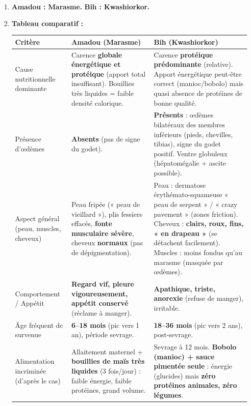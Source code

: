 \documentclass[11pt]{article}
\begin{document}
\begin{corrige}
\begin{enumerate}
    \item \textbf{Amadou : Marasme.} \textbf{Bih : Kwashiorkor.}
    \item \textbf{Tableau comparatif :}
    \begin{center}
    \begin{tabularx}{\linewidth}{|l|X|X|}\hline
    \rowcolor{popblueL}
    \textbf{Critère} & \textbf{Amadou (Marasme)} & \textbf{Bih (Kwashiorkor)} \\ \hline
    Cause nutritionnelle dominante & Carence \textbf{globale énergétique et protéique} (apport total insuffisant). Bouillies très liquides = faible densité calorique. & Carence \textbf{protéique prédominante} (relative). Apport énergétique peut-être correct (manioc/bobolo) mais quasi absence de protéines de bonne qualité. \\ \hline
    Présence d'œdèmes & \textbf{Absents} (pas de signe du godet). & \textbf{Présents} : œdèmes bilatéraux des membres inférieurs (pieds, chevilles, tibias), signe du godet positif. Ventre globuleux (hépatomégalie + ascite possible). \\ \hline
    Aspect général (peau, muscles, cheveux) & Peau fripée (« peau de vieillard »), plis fessiers effacés, \textbf{fonte musculaire sévère}, cheveux \textbf{normaux} (pas de dépigmentation). & Peau : dermatose érythémato-squameuse « peau de serpent » / « crazy pavement » (zones friction). Cheveux : \textbf{clairs, roux, fins, « en drapeau »} (se détachent facilement). Muscles : moins fondus qu'au marasme (masquée par œdèmes). \\ \hline
    Comportement / Appétit & \textbf{Regard vif, pleure vigoureusement, appétit conservé} (réclame à manger). & \textbf{Apathique, triste, anorexie} (refuse de manger), irritable. \\ \hline
    Âge fréquent de survenue & \textbf{6–18 mois} (pic vers 1 an), période sevrage. & \textbf{18–36 mois} (pic vers 2 ans), post-sevrage. \\ \hline
    Alimentation incriminée (d'après le cas) & Allaitement maternel + \textbf{bouillies de maïs très liquides} (3 fois/jour) : faible énergie, faible protéines, grand volume. & Sevrage à 12 mois. \textbf{Bobolo (manioc) + sauce pimentée seule} : énergie (glucides) mais \textbf{zéro protéines animales, zéro légumes}. \\ \hline
    \end{tabularx}

\end{center}
\end{enumerate}
\end{corrige}
\end{document}
